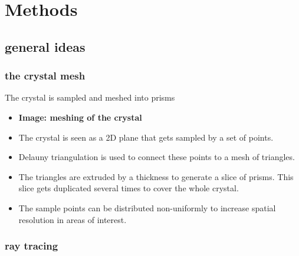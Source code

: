 \section{Methods}

\subsection{general ideas}

\subsubsection{the crystal mesh}

The crystal is sampled and meshed into prisms

\begin{itemize}

  \item \textbf{Image: meshing of the crystal}

  \item The crystal is seen as a 2D plane that gets sampled by a set of
    points.\label{label:meshSampling}

  \item Delauny triangulation is used to connect these points to a mesh of
    triangles.

  \item The triangles are extruded by a thickness to generate a slice of
    prisms. This slice gets duplicated several times to cover the whole
    crystal.

  \item The sample points can be distributed non-uniformly to increase
    spatial resolution in areas of interest.

\end{itemize}



\subsubsection{ray tracing}

